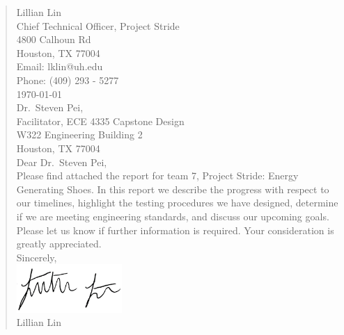\documentclass[letterpaper, 12 pt, onecolumn, hidelinks]{ieeetran}
\begin{document}
\thispagestyle{empty}\vspace*{\fill} {}
\vspace*{\fill} 

\break

\thispagestyle{empty}\vspace*{\fill} 

\begin{quote}  	
	Lillian Lin\\Chief Technical Officer, Project Stride\\4800 Calhoun Rd\\Houston, TX 77004\\Email: lklin@uh.edu\\Phone: (409) 293 - 5277\vspace{0.5cm} \\
	\today \vspace{0.5cm}\\
	Dr.\ Steven Pei,\\
	Facilitator, ECE 4335 Capstone Design\\
	W322 Engineering Building 2\\
	Houston, TX 77004
	\vspace{2cm} \\
	
	Dear Dr.\ Steven Pei,\medskip\\
	Please find attached the report for team 7, Project Stride: Energy Generating Shoes. In this report we describe the progress with respect to our timelines, highlight the testing procedures we have designed, determine if we are meeting engineering standards, and discuss our upcoming goals. Please let us know if further information is required. Your consideration is greatly appreciated.\vspace{0.5cm}\\
	Sincerely,\\
	
	\includegraphics[width=4cm]{LilliansSignature.png}
	\medskip\\
	Lillian Lin 
\end{quote}
\setcounter{page}{0}\vspace*{\fill}
\break
\end{document}
